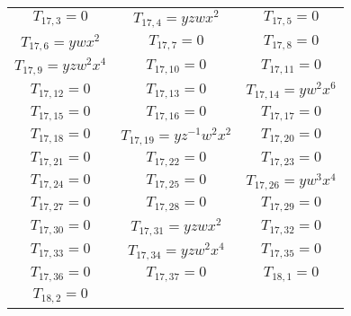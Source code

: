 \begin{longtable}{|c|c|c|}
$T_{17,3}= 0$&

$T_{17,4}= yzwx^2$&

$T_{17,5}= 0$\\

$T_{17,6}= ywx^2$&

$T_{17,7}= 0$&

$T_{17,8}= 0$\\

$T_{17,9}= yzw^2x^4$&

$T_{17,10}= 0$&

$T_{17,11}= 0$\\

$T_{17,12}= 0$&

$T_{17,13}= 0$&

$T_{17,14}= yw^2x^6$\\

$T_{17,15}= 0$&

$T_{17,16}= 0$&

$T_{17,17}= 0$\\

$T_{17,18}= 0$&

$T_{17,19}= yz^{-1}w^2x^2$&

$T_{17,20}= 0$\\

$T_{17,21}= 0$&

$T_{17,22}= 0$&

$T_{17,23}= 0$\\

$T_{17,24}= 0$&

$T_{17,25}= 0$&

$T_{17,26}= yw^3x^4$\\

$T_{17,27}= 0$&

$T_{17,28}= 0$&

$T_{17,29}= 0$\\

$T_{17,30}= 0$&

$T_{17,31}= yzwx^2$&

$T_{17,32}= 0$\\

$T_{17,33}= 0$&

$T_{17,34}= yzw^2x^4$&

$T_{17,35}= 0$\\

$T_{17,36}= 0$&

$T_{17,37}= 0$&

$T_{18,1}= 0$\\

$T_{18,2}= 0$&


\end{longtable}
